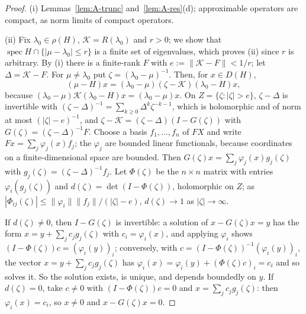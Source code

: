 \documentclass[11pt]{article}
\theoremstyle{definition}
\newcommand{\spec}{\operatorname{spec}}
\begin{document}
\begin{proof}
(i) Lemmas~\ref{lem:A-trunc} and~\ref{lem:A-res}(d); approximable operators are compact, as norm limits of compact operators.

(ii) Fix $\lambda_0 \in \rho(H)$, $\mathcal K = R(\lambda_0)$ and $r > 0$; we show that $\spec H \cap \{|\mu - \lambda_0| \le r\}$ is a finite set of eigenvalues, which proves (ii) since $r$ is arbitrary. By (i) there is a finite-rank $F$ with $e := \|\mathcal K - F\| < 1/r$; let $\Delta = \mathcal K - F$. For $\mu \ne \lambda_0$ put $\zeta = (\lambda_0 - \mu)^{-1}$. Then, for $x \in D(H)$,
\begin{equation}\label{eq:A-factor}
  (\mu - H)x = (\lambda_0 - \mu)(\zeta - \mathcal K)(\lambda_0 - H)x,
\end{equation}
because $(\lambda_0 - \mu)\mathcal K(\lambda_0 - H)x = (\lambda_0 - \mu)x$. On $Z = \{\zeta : |\zeta| > e\}$, $\zeta - \Delta$ is invertible with $(\zeta - \Delta)^{-1} = \sum_{k\ge0}\Delta^k\zeta^{-k-1}$, which is holomorphic and of norm at most $(|\zeta| - e)^{-1}$, and $\zeta - \mathcal K = (\zeta - \Delta)(I - G(\zeta))$ with $G(\zeta) = (\zeta - \Delta)^{-1}F$. Choose a basis $f_1, \dots, f_n$ of $FX$ and write $Fx = \sum_j\varphi_j(x)f_j$; the $\varphi_j$ are bounded linear functionals, because coordinates on a finite-dimensional space are bounded. Then $G(\zeta)x = \sum_j\varphi_j(x)g_j(\zeta)$ with $g_j(\zeta) = (\zeta - \Delta)^{-1}f_j$. Let $\Phi(\zeta)$ be the $n \times n$ matrix with entries $\varphi_i(g_j(\zeta))$ and $d(\zeta) = \det(I - \Phi(\zeta))$, holomorphic on $Z$; as $|\Phi_{ij}(\zeta)| \le \|\varphi_i\|\|f_j\|/(|\zeta| - e)$, $d(\zeta) \to 1$ as $|\zeta| \to \infty$.

If $d(\zeta) \ne 0$, then $I - G(\zeta)$ is invertible: a solution of $x - G(\zeta)x = y$ has the form $x = y + \sum_jc_jg_j(\zeta)$ with $c_i = \varphi_i(x)$, and applying $\varphi_i$ shows $(I - \Phi(\zeta))c = (\varphi_i(y))_i$; conversely, with $c = (I - \Phi(\zeta))^{-1}(\varphi_i(y))_i$, the vector $x = y + \sum_jc_jg_j(\zeta)$ has $\varphi_i(x) = \varphi_i(y) + (\Phi(\zeta)c)_i = c_i$ and so solves it. So the solution exists, is unique, and depends boundedly on $y$. If $d(\zeta) = 0$, take $c \ne 0$ with $(I - \Phi(\zeta))c = 0$ and $x = \sum_jc_jg_j(\zeta)$: then $\varphi_i(x) = c_i$, so $x \ne 0$ and $x - G(\zeta)x = 0$.


\end{proof}
\end{document}
